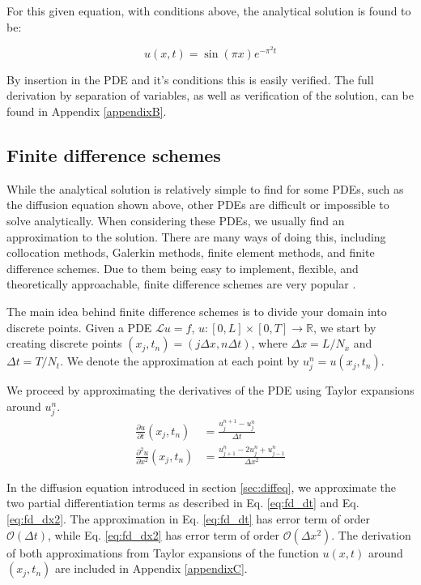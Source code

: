 For this given equation, with conditions above, the analytical solution is found to be: 

\begin{equation}\label{analytical_sol}
    u(x,t) = \sin(\pi x) e^{-\pi^2 t}
\end{equation}

By insertion in the PDE and it's conditions this is easily verified. The full derivation by separation of variables, as well as verification of the solution, can be found in Appendix \ref{appendixB}.

\subsection{Finite difference schemes}\label{sec:FD}
While the analytical solution is relatively simple to find for some PDEs, such as the diffusion equation shown above, other PDEs are difficult or impossible to solve analytically.
When considering these PDEs, we usually find an approximation to the solution.
There are many ways of doing this, including collocation methods, Galerkin methods, finite element methods, and finite difference schemes.
Due to them being easy to implement, flexible, and theoretically approachable, finite difference schemes are very popular \citep[p. 119]{tveitoPDE}.

The main idea behind finite difference schemes is to divide your domain into discrete points.
Given a PDE $\mathcal{L}u=f$, $u : [0, L] \times [0, T] \to \mathbb{R}$, we start by creating discrete points $(x_j, t_n) = (j \Delta x, n\Delta t)$, where $\Delta x = L/N_x$ and $\Delta t = T/N_t$.
We denote the approximation at each point by $u_j^n = u(x_j, t_n)$.

We proceed by approximating the derivatives of the PDE using Taylor expansions around $u_j^n$.
\begin{align}
    \label{eq:fd_dt}
    \frac{\partial u}{\partial t}(x_j, t_n) &= \frac{u_j^{n+1}-u_j^n}{\Delta t} \\
    \label{eq:fd_dx2}
    \frac{\partial^2 u}{\partial x^2}(x_j, t_n) &= \frac{u_{j+1}^n - 2u_j^n + u_{j-1}^n}{\Delta x^2}
\end{align}

In the diffusion equation introduced in section \ref{sec:diffeq}, we approximate the two partial differentiation terms as described in Eq. \ref{eq:fd_dt} and Eq. \ref{eq:fd_dx2}.
The approximation in Eq. \ref{eq:fd_dt} has error term of order $\mathcal{O}(\Delta t)$, while Eq. \ref{eq:fd_dx2} has error term of order $\mathcal{O}(\Delta x^2)$.
The derivation of both approximations from Taylor expansions of the function $u(x, t)$ around $(x_j, t_n)$ are included in Appendix \ref{appendixC}.


